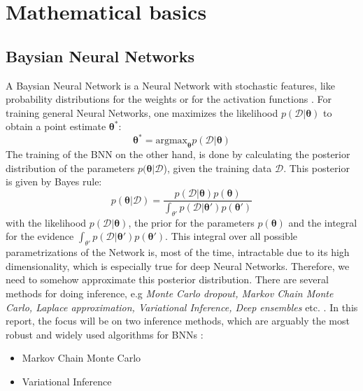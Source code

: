 \documentclass{article}
\newcommand{\argmax}{\text{argmax}}
\begin{document}
\section{Mathematical basics}
\subsection{Baysian Neural Networks}
A Baysian Neural Network is a Neural Network with stochastic features, like probability distributions for the weights or for the activation functions \cite{BNNTut}. For training general Neural Networks, one maximizes the likelihood $p(\mathcal{D}|\bm \theta)$ to obtain a point estimate $\bm \theta^*$:
\begin{equation}
    \bm \theta^* = \argmax_{\bm{\theta}} p(\mathcal{D}|\bm \theta)
\end{equation}
The training of the BNN on the other hand, is done by calculating the posterior distribution of the parameters $p(\bm \theta | \mathcal{D}$), given the training data $\mathcal D$. This posterior is given by Bayes rule:
\begin{equation} \label{eq:post_params}
    p(\bm \theta|\mathcal{D}) = \frac{p(\mathcal{D}|\bm \theta)p(\bm \theta)}{\int_{\theta'}p(\mathcal{D}|\bm \theta')p(\bm \theta')}
\end{equation}
with the likelihood $p(\mathcal{D}|\bm \theta)$, the prior for the parameters $p(\bm \theta)$ and the integral for the evidence $\int_{\theta'}p(\mathcal{D}|\bm \theta')p(\bm \theta')$. This integral over all possible parametrizations of the Network is, most of the time, intractable due to its high dimensionality, which is especially true for deep Neural Networks. Therefore, we need to somehow approximate this posterior distribution. There are several methods for doing inference, e.g \textit{Monte Carlo dropout, Markov Chain Monte Carlo, Laplace approximation, Variational Inference, Deep ensembles} etc. \cite{murphy}. In this report, the focus will be on two inference methods, which are arguably the most robust and widely used algorithms for BNNs \cite{BNNTut}:
\begin{itemize}
    \item Markov Chain Monte Carlo
    \item Variational Inference
\end{itemize}
\end{document}
